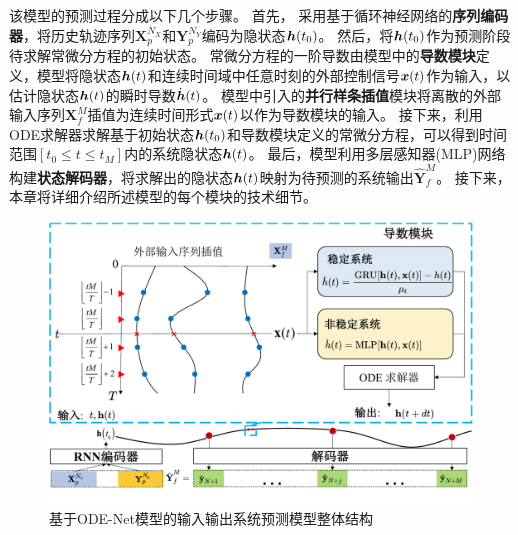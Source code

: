 该模型的预测过程分成以下几个步骤。
首先， 采用基于循环神经网络的\textbf{序列编码器}，将历史轨迹序列$\boldsymbol{X}_{p}^{N_{X}}$和$\boldsymbol{Y}_{p}^{N_{Y}}$编码为隐状态$\boldsymbol h(t_0)$。
然后，将$\boldsymbol h(t_0)$作为预测阶段待求解常微分方程的初始状态。
常微分方程的一阶导数由模型中的\textbf{导数模块}定义，模型将隐状态$\boldsymbol h(t)$和连续时间域中任意时刻的外部控制信号$\boldsymbol x(t)$作为输入，以估计隐状态$\boldsymbol h(t)$的瞬时导数$\dot{\boldsymbol h}(t)$。
模型中引入的\textbf{并行样条插值}模块将离散的外部输入序列$\boldsymbol{X}_{f}^{M}$插值为连续时间形式$\boldsymbol x(t)$以作为导数模块的输入。
接下来，利用ODE求解器求解基于初始状态$\boldsymbol h(t_0)$和导数模块定义的常微分方程，可以得到时间范围$[t_0\leq t \leq t_M]$内的系统隐状态$\boldsymbol h(t)$。
最后，模型利用多层感知器(MLP)网络构建\textbf{状态解码器}，将求解出的隐状态$\boldsymbol h(t)$映射为待预测的系统输出$\hat{\boldsymbol{Y}}_{f}^{M}$。
接下来，本章将详细介绍所述模型的每个模块的技术细节。

\begin{figure}[t]
    \centering
    \includegraphics[width=1.0\linewidth]{figures/chapter3/model.pdf}
    \caption{
    基于ODE-Net模型的输入输出系统预测模型整体结构
    }
    \label{fig:model_structure}
\end{figure}

